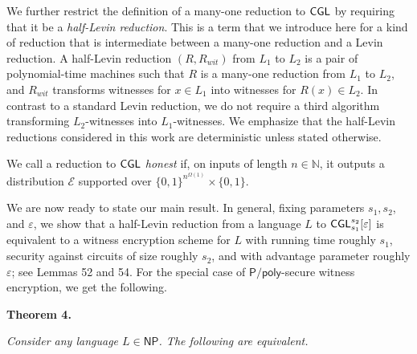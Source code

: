 \documentclass[10pt,a4paper]{article}
\begin{document}
We further restrict the definition of a many-one reduction to ${\sf CGL}$ by requiring that it be a \emph{half-Levin reduction}. This is a term that we introduce here for a kind of reduction that is intermediate between a many-one reduction and a Levin reduction. A half-Levin reduction $(R,R_{wit})$ from $L_{1}$ to $L_{2}$ is a pair of polynomial-time machines such that $R$ is a many-one reduction from $L_{1}$ to $L_{2}$, and $R_{wit}$ transforms witnesses for $x\in L_{1}$ into witnesses for $R(x)\in L_{2}$. In contrast to a standard Levin reduction, we do not require a third algorithm transforming $L_{2}$-witnesses into $L_{1}$-witnesses. We emphasize that the half-Levin reductions considered in this work are deterministic unless stated otherwise.\par




We call a reduction to ${\sf CGL}$ \emph{honest} if, on inputs of length $n\in\mathbb{N}$, it outputs a distribution $\mathcal{E}$ supported over $\{0,1\}^{n^{\Omega(1)}}\times\{0,1\}$.\par




We are now ready to state our main result. In general, fixing parameters $s_{1},s_{2}$, and $\varepsilon$, we show that a half-Levin reduction from a language $L$ to ${\sf CGL}_{s_{1}}^{s_{2}}[\varepsilon]$ is equivalent to a witness encryption scheme for $L$ with running time roughly $s_{1}$, security against circuits of size roughly $s_{2}$, and with advantage parameter roughly $\varepsilon$; see Lemmas 52 and 54. For the special case of ${\mathsf{P}}/{\mathsf{poly}}$-secure witness encryption, we get the following.\par





\par\medskip\noindent\textbf{
\textbf{Theorem 4}\textbf{.}
}\par



\emph{Consider any language $L\in{\mathsf{NP}}$. The following are equivalent.}\par
\end{document}
